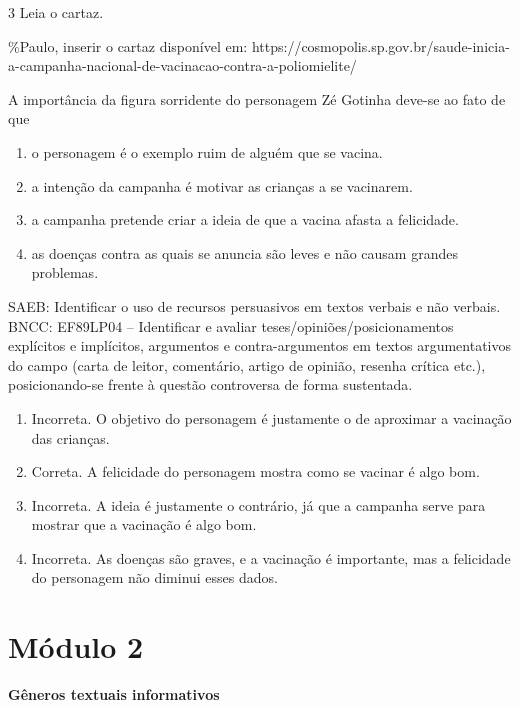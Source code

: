 \num{3} Leia o cartaz.

\%Paulo, inserir o cartaz disponível em:
https://cosmopolis.sp.gov.br/saude-inicia-a-campanha-nacional-de-vacinacao-contra-a-poliomielite/

A importância da figura sorridente do personagem Zé Gotinha deve-se ao
fato de que

\begin{enumerate}
\def\labelenumi{\alph{enumi})}
\tightlist
\item
  o personagem é o exemplo ruim de alguém que se vacina.
\item
  a intenção da campanha é motivar as crianças a se vacinarem.
\item
  a campanha pretende criar a ideia de que a vacina afasta a felicidade.
\item
  as doenças contra as quais se anuncia são leves e não causam grandes
  problemas.
\end{enumerate}

SAEB: Identificar o uso de recursos persuasivos em textos verbais e não
verbais. BNCC: EF89LP04 -- Identificar e avaliar
teses/opiniões/posicionamentos explícitos e implícitos, argumentos e
contra-argumentos em textos argumentativos do campo (carta de leitor,
comentário, artigo de opinião, resenha crítica etc.), posicionando-se
frente à questão controversa de forma sustentada.

\begin{enumerate}
\def\labelenumi{\alph{enumi})}
\tightlist
\item
  Incorreta. O objetivo do personagem é justamente o de aproximar a
  vacinação das crianças.
\item
  Correta. A felicidade do personagem mostra como se vacinar é algo bom.
\item
  Incorreta. A ideia é justamente o contrário, já que a campanha serve
  para mostrar que a vacinação é algo bom.
\item
  Incorreta. As doenças são graves, e a vacinação é importante, mas a
  felicidade do personagem não diminui esses dados.
\end{enumerate}


\section{Módulo 2}

\textbf{Gêneros textuais informativos}


